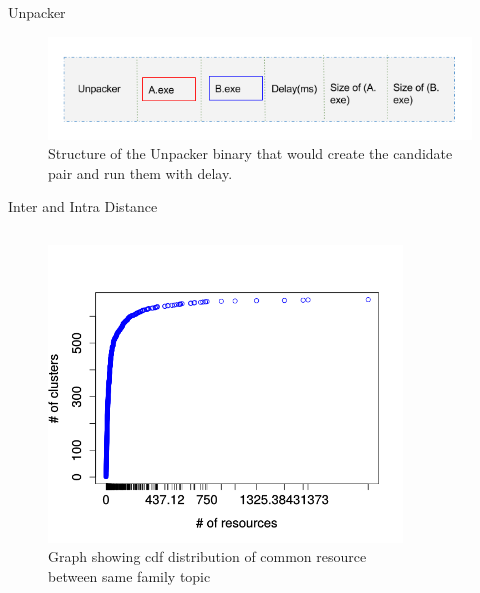 \documentclass[]{beamer}
\begin{document}
\begin{frame}[plain]{Unpacker}
\begin{figure}[H]
  \centering
  \includegraphics[scale=0.5]{figures/unpacker.png}
\caption{Structure of the Unpacker binary that would create the candidate pair and run them with delay.}
\label{fig:unpacker}
\end{figure}
\end{frame}
\begin{frame}[plain]{Inter and Intra Distance}
\begin{columns}
  \begin{column}{5cm}
    \begin{figure}[H]
      \begin{center}
        \includegraphics[scale=0.3]{figures/intra_clustered_common.png}
      \end{center}
      \captionsetup{font=small}
      \caption{ Graph showing cdf distribution of common resource between same family topic}
    \end{figure}
  \end{column}
  \begin{column}{5cm}
    \begin{figure}[H]

\end{figure}
\end{column}
\end{columns}
\end{frame}
\end{document}
